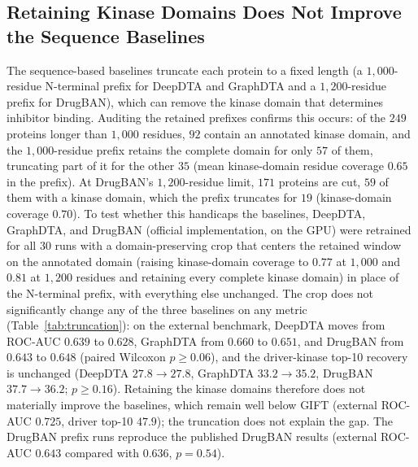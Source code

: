 \documentclass[11pt,letterpaper]{article}
\begin{document}
\subsection{Retaining Kinase Domains Does Not Improve the Sequence Baselines}
\label{sec:truncation}
The sequence-based baselines truncate each protein to a fixed length (a $1{,}000$-residue N-terminal prefix for DeepDTA and GraphDTA and a $1{,}200$-residue prefix for DrugBAN), which can remove the kinase domain that determines inhibitor binding. Auditing the retained prefixes confirms this occurs: of the $249$ proteins longer than $1{,}000$ residues, $92$ contain an annotated kinase domain, and the $1{,}000$-residue prefix retains the complete domain for only $57$ of them, truncating part of it for the other $35$ (mean kinase-domain residue coverage $0.65$ in the prefix). At DrugBAN's $1{,}200$-residue limit, $171$ proteins are cut, $59$ of them with a kinase domain, which the prefix truncates for $19$ (kinase-domain coverage $0.70$). To test whether this handicaps the baselines, DeepDTA, GraphDTA, and DrugBAN (official implementation, on the GPU) were retrained for all 30 runs with a domain-preserving crop that centers the retained window on the annotated domain (raising kinase-domain coverage to $0.77$ at $1{,}000$ and $0.81$ at $1{,}200$ residues and retaining every complete kinase domain) in place of the N-terminal prefix, with everything else unchanged. The crop does not significantly change any of the three baselines on any metric (Table~\ref{tab:truncation}): on the external benchmark, DeepDTA moves from ROC-AUC $0.639$ to $0.628$, GraphDTA from $0.660$ to $0.651$, and DrugBAN from $0.643$ to $0.648$ (paired Wilcoxon $p\geq0.06$), and the driver-kinase top-10 recovery is unchanged (DeepDTA $27.8\to27.8$, GraphDTA $33.2\to35.2$, DrugBAN $37.7\to36.2$; $p\geq0.16$). Retaining the kinase domains therefore does not materially improve the baselines, which remain well below GIFT (external ROC-AUC $0.725$, driver top-10 $47.9$); the truncation does not explain the gap. The DrugBAN prefix runs reproduce the published DrugBAN results (external ROC-AUC $0.643$ compared with $0.636$, $p=0.54$).
\end{document}
